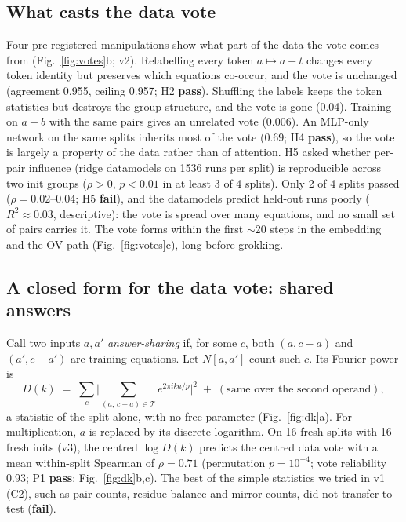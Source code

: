 \documentclass[10pt]{article}
\newcommand{\pass}{\textcolor{green!45!black}{\textbf{pass}}}
\newcommand{\fail}{\textcolor{red!70!black}{\textbf{fail}}}
\newcommand{\Dk}{D(k)}
\begin{document}
\subsection{What casts the data vote}
\label{sec:anatomy}
Four pre-registered manipulations show what part of the data the vote comes from (Fig.~\ref{fig:votes}b; v2). Relabelling
every token $a\mapsto a+t$ changes every token identity but preserves which equations co-occur, and the vote is unchanged
(agreement 0.955, ceiling 0.957; H2 \pass). Shuffling the labels keeps the token statistics but destroys the group
structure, and the vote is gone (0.04). Training on $a-b$ with the same pairs gives an unrelated vote (0.006). An MLP-only
network on the same splits inherits most of the vote (0.69; H4 \pass), so the vote is largely a property of the data
rather than of attention. H5 asked whether per-pair influence (ridge datamodels on 1536 runs per split) is reproducible across two init groups
($\rho>0$, $p<0.01$ in at least 3 of 4 splits). Only 2 of 4 splits passed ($\rho=0.02$--$0.04$; H5 \fail), and the
datamodels predict held-out runs poorly ($R^2\approx0.03$, descriptive): the vote is spread over many equations, and no
small set of pairs carries it. The vote forms within the first $\sim$20 steps in the embedding and the OV path
(Fig.~\ref{fig:votes}c), long before grokking.

\subsection{A closed form for the data vote: shared answers}
\label{sec:dk}
Call two inputs $a,a'$ \emph{answer-sharing} if, for some $c$, both $(a,c-a)$ and $(a',c-a')$ are training equations.
Let $N[a,a']$ count such $c$. Its Fourier power is
\begin{equation}
  \Dk \;=\; \sum_{c}\Big|\sum_{(a,\,c-a)\in\mathcal{T}} e^{2\pi i k a/p}\Big|^2 \;+\; (\text{same over the second operand}),
  \label{eq:dk}
\end{equation}
a statistic of the split alone, with no free parameter (Fig.~\ref{fig:dk}a). For multiplication, $a$ is replaced by its
discrete logarithm. On 16 fresh splits with 16 fresh inits (v3), the centred $\log\Dk$ predicts the centred data vote with
a mean within-split Spearman of $\rho=\mathbf{0.71}$ (permutation $p=10^{-4}$; vote reliability 0.93; P1 \pass;
Fig.~\ref{fig:dk}b,c). The best of the simple statistics we tried in v1 (C2), such as pair counts, residue balance and
mirror counts, did not transfer to test (\fail).
\end{document}
